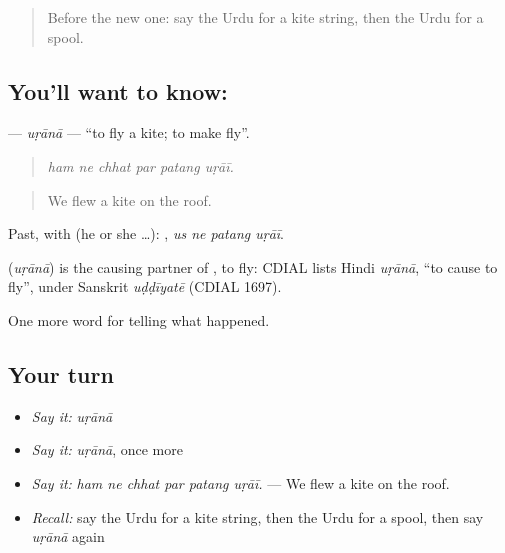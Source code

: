 \begin{quote}
Before the new one: say the Urdu for a kite string, then the Urdu for a spool.
\end{quote}

\subsection*{You'll want to know: }
\textbf{} — \emph{uṛānā} — \textquotedblleft{}to fly a kite; to make fly\textquotedblright{}.

\begin{quote}
     
\end{quote}

\begin{quote}
\emph{ham ne chhat par patang uṛāī.}
\end{quote}

\begin{quote}
We flew a kite on the roof.
\end{quote}

Past, with  (he or she …):    , \emph{us ne patang uṛāī}.

\begin{cousinweb}
\textbf{} (\emph{uṛānā}) is the causing partner of \textbf{}, to fly: CDIAL lists Hindi \emph{uṛānā}, \textquotedblleft{}to cause to fly\textquotedblright{}, under Sanskrit \emph{uḍḍīyatē} (CDIAL 1697).
\end{cousinweb}

\begin{grammarlens}[title={What you've built}]
One more word for telling what happened.
\end{grammarlens}

\subsection*{Your turn}
\begin{itemize}
\raggedright
  \item \emph{Say it:} \emph{uṛānā}
  \item \emph{Say it:} \emph{uṛānā}, once more
  \item \emph{Say it:} \emph{ham ne chhat par patang uṛāī.} — We flew a kite on the roof.
  \item \emph{Recall:} say the Urdu for a kite string, then the Urdu for a spool, then say \emph{uṛānā} again
\end{itemize}

